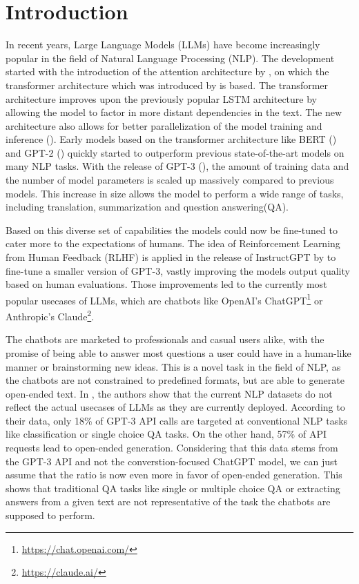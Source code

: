 \chapter{Introduction}\label{structure}
In recent years, Large Language Models (LLMs) have become increasingly popular in the field of Natural Language Processing (NLP).
The development started with the introduction of the attention architecture by \cite{bahdanau:2014:neural}, on which the transformer architecture which was introduced by \cite{vaswani:2017:Attention} is based.
The transformer architecture improves upon the previously popular LSTM architecture by allowing the model to factor in more distant dependencies in the text.
The new architecture also allows for better parallelization of the model training and inference (\cite{vaswani:2017:Attention}).
Early models based on the transformer architecture like BERT (\cite{devlin:2018:BERT}) and GPT-2 (\cite{radford:2018:Improving}) quickly started to outperform previous state-of-the-art models on many NLP tasks.
With the release of GPT-3 (\cite{brown:2020:Language}), the amount of training data and the number of model parameters is scaled up massively compared to previous models.
This increase in size allows the model to perform a wide range of tasks, including translation, summarization and question answering(QA).

Based on this diverse set of capabilities the models could now be fine-tuned to cater more to the expectations of humans. 
The idea of Reinforcement Learning from Human Feedback (RLHF) is applied in the release of InstructGPT by \cite{ouyang:2022:Training} to fine-tune a smaller version of GPT-3, vastly improving the models output quality based on human evaluations.
Those improvements led to the currently most popular usecases of LLMs, which are chatbots like OpenAI's ChatGPT\footnote{\url{https://chat.openai.com/}} or Anthropic's Claude\footnote{\url{https://claude.ai/}}.

The chatbots are marketed to professionals and casual users alike, with the promise of being able to answer most questions a user could have in a human-like manner or brainstorming new ideas.
This is a novel task in the field of NLP, as the chatbots are not constrained to predefined formats, but are able to generate open-ended text.
In \cite{ouyang:2022:Training}, the authors show that the current NLP datasets do not reflect the actual usecases of LLMs as they are currently deployed.
According to their data, only 18\% of GPT-3 API calls are targeted at conventional NLP tasks like classification or single choice QA tasks.
On the other hand, 57\% of API requests lead to open-ended generation.
Considering that this data stems from the GPT-3 API and not the converstion-focused ChatGPT model, we can just assume that the ratio is now even more in favor of open-ended generation.
This shows that traditional QA tasks like single or multiple choice QA or extracting answers from a given text are not representative of the task the chatbots are supposed to perform.

